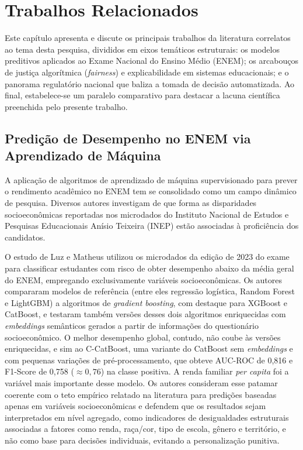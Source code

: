\chapter{Trabalhos Relacionados}
\label{cap:trabalhos_relacionados}

Este capítulo apresenta e discute os principais trabalhos da literatura correlatos ao tema desta pesquisa, divididos em eixos temáticos estruturais: os modelos preditivos aplicados ao Exame Nacional do Ensino Médio (ENEM); os arcabouços de justiça algorítmica (\textit{fairness}) e explicabilidade em sistemas educacionais; e o panorama regulatório nacional que baliza a tomada de decisão automatizada. Ao final, estabelece-se um paralelo comparativo para destacar a lacuna científica preenchida pelo presente trabalho.

\section{Predição de Desempenho no ENEM via Aprendizado de Máquina}
\label{sec:predicao_enem_ml}

A aplicação de algoritmos de aprendizado de máquina supervisionado para prever o rendimento acadêmico no ENEM tem se consolidado como um campo dinâmico de pesquisa. Diversos autores investigam de que forma as disparidades socioeconômicas reportadas nos microdados do Instituto Nacional de Estudos e Pesquisas Educacionais Anísio Teixeira (INEP) estão associadas à proficiência dos candidatos.

O estudo de Luz e Matheus \cite{luz2025uso} utilizou os microdados da edição de 2023 do exame para classificar estudantes com risco de obter desempenho abaixo da média geral do ENEM, empregando exclusivamente variáveis socioeconômicas. Os autores compararam modelos de referência (entre eles regressão logística, Random Forest e LightGBM) a algoritmos de \textit{gradient boosting}, com destaque para XGBoost e CatBoost, e testaram também versões desses dois algoritmos enriquecidas com \textit{embeddings} semânticos gerados a partir de informações do questionário socioeconômico. O melhor desempenho global, contudo, não coube às versões enriquecidas, e sim ao C-CatBoost, uma variante do CatBoost sem \textit{embeddings} e com pequenas variações de pré-processamento, que obteve AUC-ROC de 0,816 e F1-Score de 0,758 ($\approx 0{,}76$) na classe positiva. A renda familiar \textit{per capita} foi a variável mais importante desse modelo. Os autores consideram esse patamar coerente com o teto empírico relatado na literatura para predições baseadas apenas em variáveis socioeconômicas e defendem que os resultados sejam interpretados em nível agregado, como indicadores de desigualdades estruturais associadas a fatores como renda, raça/cor, tipo de escola, gênero e território, e não como base para decisões individuais, evitando a personalização punitiva.

